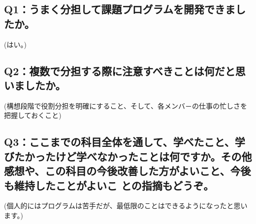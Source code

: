 \documentclass[12pt,a4j]{jarticle}
\begin{document}
\subsection{Q1：うまく分担して課題プログラムを開発できましたか。}

(はい。)

\subsection{Q2：複数で分担する際に注意すべきことは何だと思いましたか。}

(構想段階で役割分担を明確にすること、そして、各メンバ－の仕事の忙しさを把握しておくこと)

\subsection{Q3：ここまでの科目全体を通して、学べたこと、学びたかったけど学べなかったことは何ですか。その他感想や、この科目の今後改善した方がよいこと、今後も維持したことがよいこ との指摘もどうぞ。}

(個人的にはプログラムは苦手だが、最低限のことはできるようになったと思います。)
\end{document}
